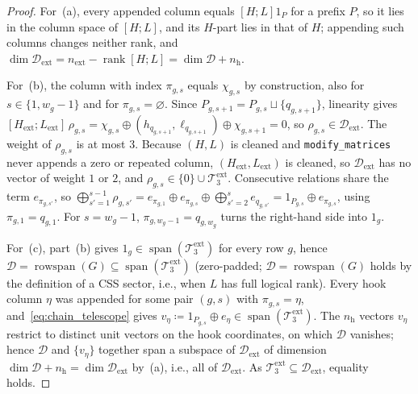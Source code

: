 \documentclass[12pt]{article}
\theoremstyle{definition}
\DeclareMathOperator{\rank}{rank}
\newcommand{\Dc}{\mathcal{D}}
\newcommand{\Tc}{\mathcal{T}_3}
\newcommand{\ttt}[1]{\texttt{#1}}
\begin{document}
\begin{proof}
For~(a), every appended column equals $[H; L] 1_P$ for a prefix $P$, so it lies in the column space of $[H; L]$, and
its $H$-part lies in that of $H$; appending such columns changes neither rank, and $\dim \Dc_{\mathrm{ext}} =
n_{\mathrm{ext}} - \rank[H; L] = \dim \Dc + n_{\mathrm{h}}$.

For~(b), the column with index $\pi_{g,s}$ equals $\chi_{g,s}$ by construction, also for $s \in \{1, w_g - 1\}$ and
for $\pi_{g,s} = \varnothing$. Since $P_{g,s+1} = P_{g,s} \sqcup \{q_{g,s+1}\}$, linearity gives $[H_{\mathrm{ext}};
L_{\mathrm{ext}}]\, \rho_{g,s} = \chi_{g,s} \oplus (h_{q_{g,s+1}}, \ell_{q_{g,s+1}}) \oplus \chi_{g,s+1} = 0$, so
$\rho_{g,s} \in \Dc_{\mathrm{ext}}$. The weight of $\rho_{g,s}$ is at most $3$. Because $(H, L)$ is cleaned and
\ttt{modify\_matrices} never appends a zero or repeated column, $(H_{\mathrm{ext}}, L_{\mathrm{ext}})$ is cleaned, so
$\Dc_{\mathrm{ext}}$ has no vector of weight $1$ or $2$, and $\rho_{g,s} \in \{0\} \cup \Tc^{\mathrm{ext}}$.
Consecutive relations share the term $e_{\pi_{g,s'}}$, so $\bigoplus_{s'=1}^{s-1} \rho_{g,s'} = e_{\pi_{g,1}} \oplus
e_{\pi_{g,s}} \oplus \bigoplus_{s'=2}^{s} e_{q_{g,s'}} = 1_{P_{g,s}} \oplus e_{\pi_{g,s}}$, using $\pi_{g,1} =
q_{g,1}$. For $s = w_g - 1$, $\pi_{g,w_g-1} = q_{g,w_g}$ turns the right-hand side into $1_g$.

For~(c), part~(b) gives $1_g \in \operatorname{span}(\Tc^{\mathrm{ext}})$ for every row $g$, hence $\Dc =
\operatorname{rowspan}(G) \subseteq \operatorname{span}(\Tc^{\mathrm{ext}})$ (zero-padded; $\Dc =
\operatorname{rowspan}(G)$ holds by the definition of a CSS sector, i.e., when $L$ has full logical rank). Every hook
column $\eta$
was appended for some pair $(g, s)$ with $\pi_{g,s} = \eta$, and~\eqref{eq:chain_telescope} gives $v_\eta \coloneqq
1_{P_{g,s}} \oplus e_\eta \in \operatorname{span}(\Tc^{\mathrm{ext}})$. The $n_{\mathrm{h}}$ vectors $v_\eta$ restrict
to distinct unit vectors on the hook coordinates, on which $\Dc$ vanishes; hence $\Dc$ and $\{v_\eta\}$ together span a
subspace of $\Dc_{\mathrm{ext}}$ of dimension $\dim \Dc + n_{\mathrm{h}} = \dim \Dc_{\mathrm{ext}}$ by~(a), i.e., all of
$\Dc_{\mathrm{ext}}$. As $\Tc^{\mathrm{ext}} \subseteq \Dc_{\mathrm{ext}}$, equality holds.


\end{proof}
\end{document}
